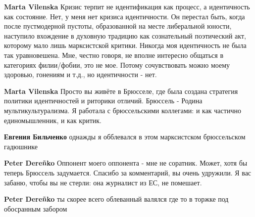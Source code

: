 \begin{itemize}
\begin{itemize}
\textbf{Marta Vilenska} Кризис терпит не идентификация как процесс, а идентичность как состояние. Нет, у меня нет кризиса идентичности. Он перестал быть, когда после пустмодерной пустоты, образованной на месте либеральной юности, наступило вхождение в духовную традицию как сознательный поэтический акт, которому мало лишь марксистской критики. Никогда моя идентичность не была так уравновешена. Мне, честно говоря, не вполне интересно общаться в категориях филии/фобии, это не мое. Потому сочувствовать можно моему здоровью, гонениям и т.д., но идентичности - нет.

 
\textbf{Marta Vilenska} Просто вы живёте в Брюсселе, где была создана стратегия политики идентичностей и риторики отличий. Брюссель - Родина мультикультурализма. Я работала с брюссельскими коллегами: и как частично единомышленник, и как критик.

 
\textbf{Евгения Бильченко} однажды я обблевался в этом марксистском брюссельском гадюшнике🤮🤮

 
\textbf{Peter Dereñko} Оппонент моего оппонента - мне не соратник. Может, хотя бы теперь Брюссель задумается. Спасибо за комментарий, вы очень удружили. Я вас забаню, чтобы вы не стерли: она журналист из ЕС, не помешает.

 
\textbf{Peter Dereñko} ты скорее всего облеванный валялся где то в торжке под обосранным забором


\end{itemize}
\end{itemize}
